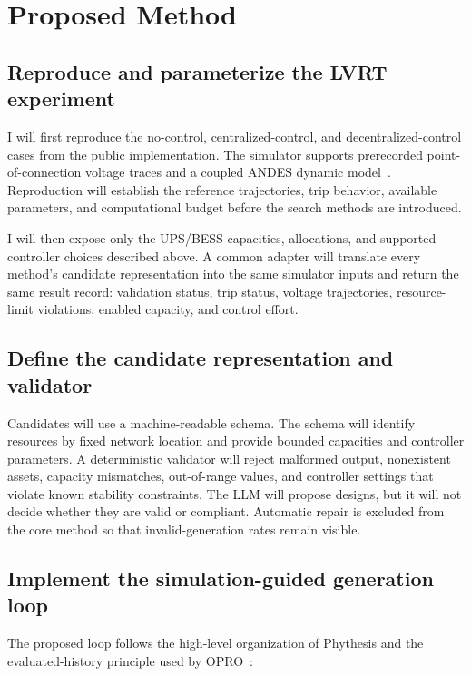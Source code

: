\documentclass[11pt,a4paper]{article}
\begin{document}
\section{Proposed Method}

\subsection{Reproduce and parameterize the LVRT experiment}

I will first reproduce the no-control, centralized-control, and decentralized-control cases from the public implementation. The simulator supports prerecorded point-of-connection voltage traces and a coupled ANDES dynamic model~\cite{xie2026lvrt,cui2021andes}. Reproduction will establish the reference trajectories, trip behavior, available parameters, and computational budget before the search methods are introduced.

I will then expose only the UPS/BESS capacities, allocations, and supported controller choices described above. A common adapter will translate every method's candidate representation into the same simulator inputs and return the same result record: validation status, trip status, voltage trajectories, resource-limit violations, enabled capacity, and control effort.

\subsection{Define the candidate representation and validator}

Candidates will use a machine-readable schema. The schema will identify resources by fixed network location and provide bounded capacities and controller parameters. A deterministic validator will reject malformed output, nonexistent assets, capacity mismatches, out-of-range values, and controller settings that violate known stability constraints. The LLM will propose designs, but it will not decide whether they are valid or compliant. Automatic repair is excluded from the core method so that invalid-generation rates remain visible.

\subsection{Implement the simulation-guided generation loop}

The proposed loop follows the high-level organization of Phythesis and the evaluated-history principle used by OPRO~\cite{li2026phythesis,yang2024opro}:
\end{document}
